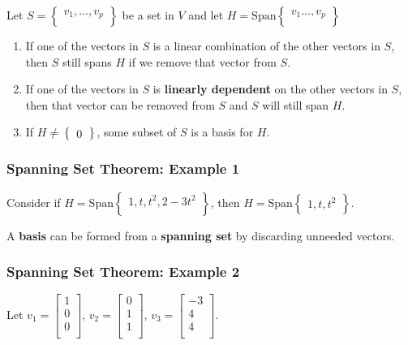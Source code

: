 \documentclass[12pt, letterpaper]{article}
\begin{document}
Let $ S =
\begin{Bmatrix}
  v_1, \hdots, v_p \\
\end{Bmatrix} $ be a set in $ V $ and let $ H = \textrm{Span}
\begin{Bmatrix}
  v_1 \hdots, v_p \\
\end{Bmatrix} $

\begin{enumerate}
  \item If one of the vectors in $ S $ is a linear combination of the
    other vectors in $ S $, then $ S $ still spans $ H $ if we remove
    that vector from $ S $.
  \item If one of the vectors in $ S $ is \textbf{linearly dependent}
    on the other vectors in $ S $, then that vector can be removed
    from $ S $ and $ S $ will still span $ H $.
  \item If $ H \neq
    \begin{Bmatrix}
      0
    \end{Bmatrix} $, some subset of $ S $ is a basis for $ H $.
\end{enumerate}

\subsubsection*{Spanning Set Theorem: Example 1}

Consider if $ H = \textrm{Span}
\begin{Bmatrix}
  1, t, t^2, 2 - 3t^2 \\
\end{Bmatrix} $, then $ H = \textrm{Span}
\begin{Bmatrix}
  1, t, t^2
\end{Bmatrix} $.
\medskip

A \textbf{basis} can be formed from a \textbf{spanning set} by
discarding unneeded vectors.

\subsubsection*{Spanning Set Theorem: Example 2}

\medskip
{\centering

  Let $ v_1 =
  \begin{bmatrix}
    1 \\
    0 \\
    0 \\
  \end{bmatrix} $,
  $ v_2 =
  \begin{bmatrix}
    0 \\
    1 \\
    1 \\
  \end{bmatrix} $,
  $ v_3 =
  \begin{bmatrix}
    -3 \\
    4 \\
    4 \\
  \end{bmatrix} $.

}
\medskip
\end{document}
